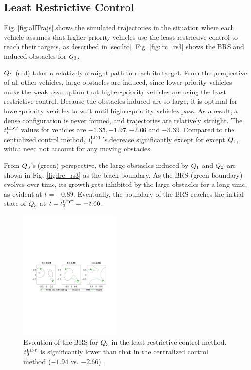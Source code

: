 \subsection{Least Restrictive Control}
Fig. \ref{fig:allTrajs} shows the simulated trajectories in the situation where each vehicle assumes that higher-priority vehicles use the least restrictive control to reach their targets, as described in \ref{sec:lrc}. Fig. \ref{fig:lrc_rs3} shows the BRS and induced obstacles for $Q_3$.

$Q_1$ (red) takes a relatively straight path to reach its target. From the perspective of all other vehicles, large obstacles are induced, since lower-priority vehicles make the weak assumption that higher-priority vehicles are using the least restrictive control. Because the obstacles induced are so large, it is optimal for lower-priority vehicles to wait until higher-priority vehicles pass. As a result, a dense configuration is never formed, and trajectories are relatively straight. The $t^\text{LDT}_i$ values for vehicles are $-1.35, -1.97, -2.66$ and $-3.39$. Compared to the centralized control method, $t^\text{LDT}_i$'s decrease significantly except for except $Q_1$, which need not account for any moving obstacles. 

From $Q_3$'s (green) perspective, the large obstacles induced by $Q_1$ and $Q_2$ are shown in Fig. \ref{fig:lrc_rs3} as the black boundary. As the BRS (green boundary) evolves over time, its growth gets inhibited by the large obstacles for a long time, as evident at $t=-0.89$. Eventually, the boundary of the BRS reaches the initial state of $Q_3$ at $t = t^\text{LDT}_3 = -2.66$.
%
%
\begin{figure}[H]
  \vspace{-1em}
  \centering
  \includegraphics[width=0.45\textwidth]{"fig/lrc_rs3"}
  \caption{Evolution of the BRS for $Q_3$ in the least restrictive control method. $t^\text{LDT}_3$ is significantly lower than that in the centralized control method ($-1.94$ vs. $-2.66$).}
\end{figure}